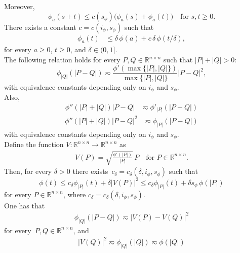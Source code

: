 \documentclass[leqno,11pt]{amsart}%
\numberwithin{equation}{section}
\def\R{\mathbb R}
\theoremstyle{definition}
\numberwithin{equation}{section}
\begin{document}
Moreover,
\begin{equation}\label{sub-additivity-phi}
    \phi_a(s+t)\le c(s_\phi)\big(\phi_a(s)+\phi_a(t)\big) \quad \text{for $s,t \geq 0$.}
\end{equation}
There exists a constant $c=c(i_\phi, s_\phi)$ such that
  \begin{align}
  \label{eq:removal-shift2}
    \phi_{a}(t) &\leq \delta\, \phi(a) + c\, \delta\,
    \phi (t/\delta),
  \end{align}
for every $a\geq 0$, $t \geq 0$, and $\delta \in (0,1]$.
\\
The following relation holds for every 
 $P,Q\in\R^{n\times
    n}$ such that $|P|+|Q|>0$:
      \begin{equation}\label{july21}
      \phi_{|Q|}(|P-Q|)
      \eqsim \frac{\phi'(\max\{|P|,|Q|\})}{\max\{|P|,|Q|\}}|P-Q|^2,
  \end{equation}
  with equivalence constants depending only on $i_\phi$ and $s_\phi$.
  \\ Also,
 \begin{align}\label{shift4}
\phi''(|P|+|Q|)|P-Q|&\eqsim \phi'_{|P|}(|P-Q|) 
\end{align}
\begin{align}\label{shift4'}\phi''(|P|+|Q|)|P-Q|^2&\eqsim \phi_{|P|}(|P-Q|) 
\end{align}
   with equivalence constants depending only on $i_\phi$ and $s_\phi$.
\\
Define the function $V: \mathbb R^{n\times n} \to \mathbb R^{n\times n}$
as
\begin{align}
    \label{V}
    V(P)= \sqrt{\frac{\phi'(|P|)}{|P|}}\,P \quad \text{for $P \in \mathbb R^{n\times n}$.}
\end{align}
 Then, 
for every $\delta>0$ there exists~$c_\delta=c_\delta(\delta,i_\phi,s_\phi)$ such that
 \begin{equation}
  \label{add-shift}
  \phi(t)
  \le
  c_\delta\phi_{|P|}(t)+\delta|V(P)|^2
  \le
  c_\delta\phi_{|P|}(t)+\delta {s_\phi}\,\phi(|P|)
\end{equation}
for every $P\in\R^{n\times n}$, where $c_\delta=c_\delta(\delta,i_\phi,s_\phi)$.
\\ One has that
 \begin{align}\label{a-coercivity-split}
    \phi_{|{Q}|} \left( |{P-Q}| \right)
    \eqsim |{V(P)-V(Q)}|^2
    \end{align}
    for every~$P,Q \in \R^{n\times n}$, and 
    \begin{align}
    \label{seconda-split}
     |{V(Q)}|^2
    \eqsim
    \phi_{|{Q}|}(|{Q}|) \eqsim \phi(|{Q}|)
  \end{align}
\end{document}
